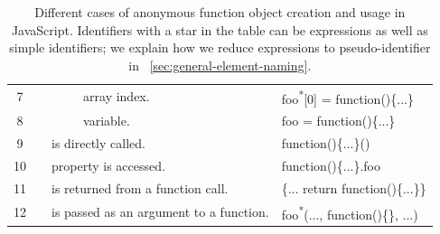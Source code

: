 \documentclass[10pt, preprint]{sigplanconf}
\begin{document}
\begin{table}[htp]
{\begin{tabular}{ | c | l | l | l | m{2.5cm} | l|}
   7 &
   &
   & \multicolumn{2}{|l|}{
      array index.}
   & foo\textsuperscript{*}[0] = function()\{...\} \\
   \cline{0-0}\cline{4-6} 

   8 &
   & 
   & \multicolumn{2}{|l|}{
      variable.}
   & foo = function()\{...\} \\
   \cline{0-0}\cline{3-6} 
   
   9 &
   & \multicolumn{3}{|m{3.8cm}|}{
     \raggedright is directly called.}
   & function()\{...\}() \\
   \cline{0-0}\cline{3-6} 

   10 &
   & \multicolumn{3}{|m{3.8cm}|}{
     \raggedright property is accessed.}
   & function()\{...\}.foo \\
   \cline{0-0}\cline{3-6} 

   11 &
   & \multicolumn{3}{|m{3.5cm}|}{
     \raggedright is returned from a function call.}
   & \{... return function()\{...\}\} \\
   \cline{0-0}\cline{3-6} 

   12 &
   & \multicolumn{3}{|m{3.5cm}|}{
     \raggedright is passed as an argument to a function.}
   & foo\textsuperscript{*}(..., function()\{\}, ...) \\
   \hline 

  \end{tabular}
    }
\caption{Different cases of anonymous function object creation and usage in JavaScript.  Identifiers with a star in the table can be expressions as well as simple identifiers; we explain how we reduce expressions to pseudo-identifier in ~\ref{sec:general-element-naming}.}
\label{table:function-types} 
\end{table}
\end{document}
